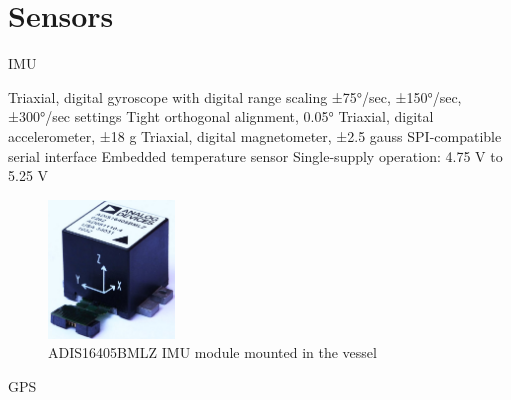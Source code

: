 \section{Sensors}

IMU


Triaxial, digital gyroscope with digital range scaling
±75°/sec, ±150°/sec, ±300°/sec settings
Tight orthogonal alignment, 0.05°
Triaxial, digital accelerometer, ±18 g
Triaxial, digital magnetometer, ±2.5 gauss
SPI-compatible serial interface
Embedded temperature sensor
Single-supply operation: 4.75 V to 5.25 V

\cite{IMUDatasheet}
\begin{figure}[H]
    \includegraphics[width=0.3\textwidth]{figures/IMU}
    \caption{ADIS16405BMLZ IMU module mounted in the vessel \cite{IMUFigure}}
    \label{fig:IMU}
\end{figure}

GPS